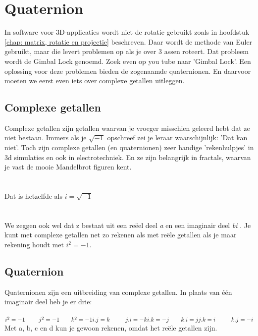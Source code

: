 \documentclass[hidelinks, a4wide, 12pt,  twoside]{book}
\begin{document}
\chapter{Quaternion}
\label{chap: Quaternion}
In software voor 3D-applicaties wordt niet de rotatie gebruikt zoals in hoofdstuk \ref{chap: matrix, rotatie en projectie} beschreven. Daar wordt de methode van Euler gebruikt, maar die levert problemen op als je over 3 assen roteert. Dat probleem wordt de Gimbal Lock genoemd. Zoek even op you tube naar 'Gimbal Lock'. 
Een oplossing voor deze problemen bieden de zogenaamde quaternionen. En daarvoor moeten we eerst even iets over complexe getallen uitleggen.
\section{Complexe getallen}
Complexe getallen zijn getallen waarvan je vroeger misschien geleerd hebt dat ze niet bestaan. Immers als je $ \sqrt{-1} $ opschreef zei je leraar waarschijnlijk: 'Dat kan niet'. Toch zijn complexe getallen (en quaternionen) zeer handige 'rekenhulpjes' in 3d simulaties en ook in electrotechniek. En ze zijn belangrijk in fractals, waarvan je vast de mooie Mandelbrot figuren kent. \\ \\
\\
Dat is hetzelfde als $ i =\sqrt{-1} $ \\ \\
\\
We zeggen ook wel dat z bestaat uit een reëel deel \textit{a} en een imaginair deel \textit{bi} .  Je kunt met complexe getallen net zo rekenen als met reële getallen als je maar rekening houdt met $  i^2 = -1.$
\section{Quaternion}
Quaternionen zijn een uitbreiding van complexe getallen. In plaats van één imaginair deel heb je er drie:\\ \\
$ i^2 = -1 \qquad  \ j^2 = -1 \qquad k^2 = -1   \\
i.j = k \qquad \ \ j.i = -k \\
i.k = -j \qquad k.i = j \\
j.k = i \qquad \ \ k.j = -i \\ $
Met a, b, c en d kun je gewoon rekenen, omdat het reële getallen zijn.\\ \\
\end{document}
